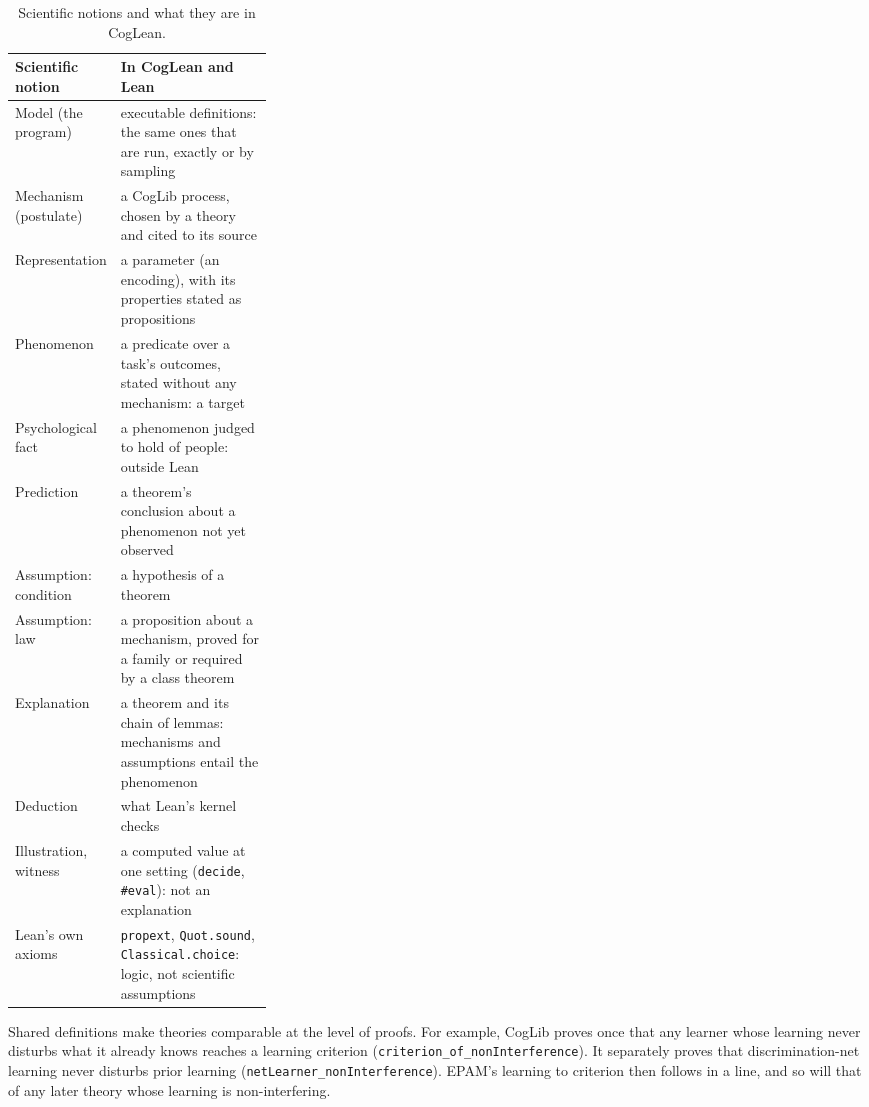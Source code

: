 \documentclass[11pt]{article}
\newcommand{\code}[1]{\texttt{#1}}
\newcommand{\lean}[1]{\texttt{#1}}
\begin{document}
\begin{table}[t]
\centering\small
\begin{tabularx}{\linewidth}{@{}>{\raggedright\arraybackslash}p{0.3\linewidth}>{\raggedright\arraybackslash}X@{}}
\toprule
Scientific notion & In CogLean and Lean \\
\midrule
Model (the program) & executable definitions: the same ones that are run, exactly or by sampling \\
Mechanism (postulate) & a CogLib process, chosen by a theory and cited to its source \\
Representation & a parameter (an encoding), with its properties stated as propositions \\
Phenomenon & a predicate over a task's outcomes, stated without any mechanism: a target \\
Psychological fact & a phenomenon judged to hold of people: outside Lean \\
Prediction & a theorem's conclusion about a phenomenon not yet observed \\
Assumption: condition & a hypothesis of a theorem \\
Assumption: law & a proposition about a mechanism, proved for a family or required by a class theorem \\
Explanation & a theorem and its chain of lemmas: mechanisms and assumptions entail the phenomenon \\
Deduction & what Lean's kernel checks \\
Illustration, witness & a computed value at one setting (\code{decide}, \code{\#eval}): not an explanation \\
Lean's own axioms & \code{propext}, \code{Quot.sound}, \code{Classical.choice}: logic, not scientific assumptions \\
\bottomrule
\end{tabularx}
\caption{Scientific notions and what they are in CogLean.}
\label{tab:map}
\end{table}

Shared definitions make theories comparable at the level of proofs. For example, CogLib proves once that any learner whose learning never disturbs what it already knows reaches a learning criterion (\lean{criterion\_of\_nonInterference}). It separately proves that discrimination-net learning never disturbs prior learning (\lean{netLearner\_nonInterference}). EPAM's learning to criterion then follows in a line, and so will that of any later theory whose learning is non-interfering.
\end{document}
